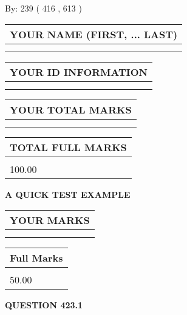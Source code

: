 \documentclass[12pt]{article}
\begin{document}
   
\hspace{1.0in} By: 
 239 ( 416 ,  613 )
   
   
   
   
\newpage 
\setcounter{page}{ 
   423001 } 
   
   
   
   
\noindent\begin{tabular}{|l|}
\hline
YOUR NAME (FIRST, ... LAST)  \\
\hline
 \\ 
 \\ 
\hline
\end{tabular}
\hspace{0.05in} \begin{tabular}{|l|}
\hline
 YOUR   ID   INFORMATION  \\
\hline
 \\ 
 \\ 
\hline
\end{tabular}
   
   
\vspace{0.2in}\noindent\begin{tabular}{|l|}
\hline
YOUR TOTAL MARKS  \\
\hline
 \\ 
 \\ 
\hline
\end{tabular}
\hspace{0.05in} \begin{tabular}{|l|}
\hline
TOTAL FULL MARKS  \\
\hline
 \\ 
100.00 \\
\hline
\end{tabular}
   
   
 \vspace{0.2in}
{\LARGE {\textbf{ A QUICK TEST EXAMPLE}}}
   
   
  
\vspace{0.2in}
  
\noindent\begin{tabular}{|l|}
\hline
 YOUR MARKS  \\
\hline
 \\ 
 \\ 
\hline
\end{tabular}
\hspace{0.05in} \begin{tabular}{|l|}
\hline
 Full Marks  \\
\hline
 \\ 
50.00 \\
\hline
\end{tabular}
{\textbf{\Large{QUESTION
423.1 
}}}
  
\end{document}
